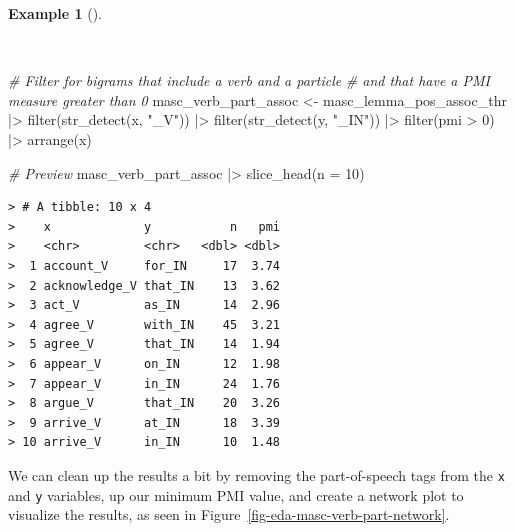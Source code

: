 \documentclass[
  letterpaper,
  DIV=11,
  numbers=noendperiod]{scrreport}
\newenvironment{Shaded}{\begin{snugshade}}{\end{snugshade}}
\newcommand{\AttributeTok}[1]{\textcolor[rgb]{0.00,0.00,0.00}{#1}}
\newcommand{\CommentTok}[1]{\textcolor[rgb]{0.00,0.00,0.00}{\textit{#1}}}
\newcommand{\DecValTok}[1]{\textcolor[rgb]{0.00,0.00,0.00}{#1}}
\newcommand{\FunctionTok}[1]{\textcolor[rgb]{0.00,0.00,0.00}{#1}}
\newcommand{\NormalTok}[1]{\textcolor[rgb]{0.00,0.00,0.00}{#1}}
\newcommand{\OtherTok}[1]{\textcolor[rgb]{0.00,0.00,0.00}{#1}}
\newcommand{\SpecialCharTok}[1]{\textcolor[rgb]{0.00,0.00,0.00}{#1}}
\newcommand{\StringTok}[1]{\textcolor[rgb]{0.00,0.00,0.00}{#1}}
\theoremstyle{definition}
\newtheorem{example}{Example}[chapter]
\theoremstyle{remark}
\begin{document}
\begin{example}[]\protect\hypertarget{exm-eda-masc-bigrams-pmi-filtered-vpc}{}\label{exm-eda-masc-bigrams-pmi-filtered-vpc}

~

\begin{Shaded}
\begin{Highlighting}[]
\CommentTok{\# Filter for bigrams that include a verb and a particle}
\CommentTok{\# and that have a PMI measure greater than 0}
\NormalTok{masc\_verb\_part\_assoc }\OtherTok{\textless{}{-}} 
\NormalTok{  masc\_lemma\_pos\_assoc\_thr }\SpecialCharTok{|\textgreater{}} 
  \FunctionTok{filter}\NormalTok{(}\FunctionTok{str\_detect}\NormalTok{(x, }\StringTok{"\_V"}\NormalTok{)) }\SpecialCharTok{|\textgreater{}} 
  \FunctionTok{filter}\NormalTok{(}\FunctionTok{str\_detect}\NormalTok{(y, }\StringTok{"\_IN"}\NormalTok{)) }\SpecialCharTok{|\textgreater{}}
  \FunctionTok{filter}\NormalTok{(pmi }\SpecialCharTok{\textgreater{}} \DecValTok{0}\NormalTok{) }\SpecialCharTok{|\textgreater{}} 
  \FunctionTok{arrange}\NormalTok{(x)}

\CommentTok{\# Preview }
\NormalTok{masc\_verb\_part\_assoc }\SpecialCharTok{|\textgreater{}} 
  \FunctionTok{slice\_head}\NormalTok{(}\AttributeTok{n =} \DecValTok{10}\NormalTok{)}
\end{Highlighting}
\end{Shaded}

\begin{verbatim}
> # A tibble: 10 x 4
>    x             y           n   pmi
>    <chr>         <chr>   <dbl> <dbl>
>  1 account_V     for_IN     17  3.74
>  2 acknowledge_V that_IN    13  3.62
>  3 act_V         as_IN      14  2.96
>  4 agree_V       with_IN    45  3.21
>  5 agree_V       that_IN    14  1.94
>  6 appear_V      on_IN      12  1.98
>  7 appear_V      in_IN      24  1.76
>  8 argue_V       that_IN    20  3.26
>  9 arrive_V      at_IN      18  3.39
> 10 arrive_V      in_IN      10  1.48
\end{verbatim}

\end{example}

We can clean up the results a bit by removing the part-of-speech tags
from the \texttt{x} and \texttt{y} variables, up our minimum PMI value,
and create a network plot to visualize the results, as seen in
Figure~\ref{fig-eda-masc-verb-part-network}.
\end{document}
